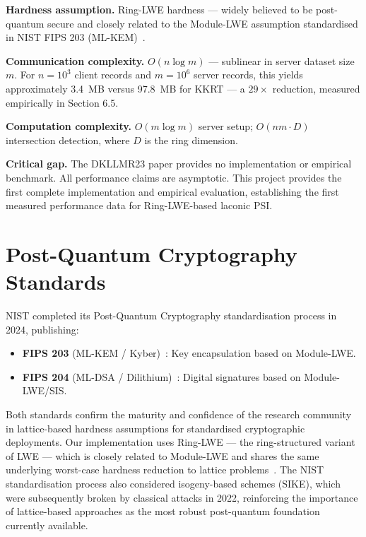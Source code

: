\textbf{Hardness assumption.} Ring-LWE hardness --- widely believed to be post-quantum
secure and closely related to the Module-LWE assumption standardised in NIST FIPS 203
(ML-KEM)~\cite{nist2024mlkem}.

\textbf{Communication complexity.} $O(n \log m)$ --- sublinear in server dataset
size $m$. For $n = 10^3$ client records and $m = 10^6$ server records, this yields
approximately 3.4~MB versus 97.8~MB for KKRT --- a $29\times$ reduction, measured
empirically in Section 6.5.

\textbf{Computation complexity.} $O(m \log m)$ server setup; $O(nm \cdot D)$
intersection detection, where $D$ is the ring dimension.

\textbf{Critical gap.} The DKLLMR23 paper provides no implementation or empirical
benchmark. All performance claims are asymptotic. This project provides the first
complete implementation and empirical evaluation, establishing the first measured
performance data for Ring-LWE-based laconic PSI.

\section{Post-Quantum Cryptography Standards}

NIST completed its Post-Quantum Cryptography standardisation process in 2024,
publishing:
\begin{itemize}
    \item \textbf{FIPS 203} (ML-KEM / Kyber)~\cite{nist2024mlkem}: Key encapsulation
          based on Module-LWE.
    \item \textbf{FIPS 204} (ML-DSA / Dilithium)~\cite{nist2024mldsa}: Digital
          signatures based on Module-LWE/SIS.
\end{itemize}

Both standards confirm the maturity and confidence of the research community in
lattice-based hardness assumptions for standardised cryptographic deployments. Our
implementation uses Ring-LWE --- the ring-structured variant of LWE --- which is
closely related to Module-LWE and shares the same underlying worst-case hardness
reduction to lattice problems~\cite{lyubashevsky2010ideal}. The NIST standardisation
process also considered isogeny-based schemes (SIKE), which were subsequently
broken by classical attacks in 2022, reinforcing the importance of lattice-based
approaches as the most robust post-quantum foundation currently available.


